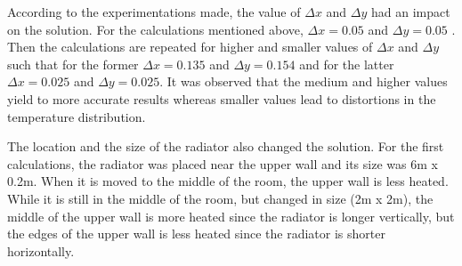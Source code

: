 \documentclass[letterpaper,12pt]{article}
\begin{document}
According to the experimentations made, the value of $\Delta x$ and $\Delta y$ had an impact on the solution. 
For the calculations mentioned above, $\Delta x = 0.05$ and $\Delta y = 0.05$ . Then the calculations are 
repeated for higher and smaller values of $\Delta x$ and $\Delta y$ such that for the former $\Delta x = 0.135$
and $\Delta y = 0.154$ and for the latter $\Delta x = 0.025$ and $\Delta y = 0.025$. It was observed that the
medium and higher values yield to more accurate results whereas smaller values lead to distortions in the
temperature distribution.

The location and the size of the radiator also changed the solution. For the first calculations, the radiator
was placed near the upper wall and its size was 6m x 0.2m. When it is moved to the middle of the room, the upper
wall is less heated. While it is still in the middle of the room, but changed in size (2m x 2m), the middle of
the upper wall is more heated since the radiator is longer vertically, but the edges of the upper wall is less
heated since the radiator is shorter horizontally.
\end{document}
